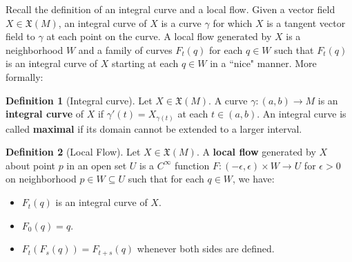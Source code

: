 \documentclass[11pt, oneside]{article}   	%
\theoremstyle{definition}
\newtheorem{definition}{Definition}[section]
\begin{document}
Recall the definition of an integral curve and a local flow. Given a vector field $X\in\mathfrak X(M)$, an integral curve of $X$ is 
a curve $\gamma$ for which $X$ is a tangent vector field to $\gamma$ at each point on the curve. A local flow generated by 
$X$ is a neighborhood $W$ and a family of curves $F_t(q)$ for each $q\in W$ such that $F_t(q)$ is an integral curve of 
$X$ starting at each $q\in W$ in a ``nice" manner. More formally:
\begin{definition}[Integral curve]
	Let $X\in\mathfrak X(M)$. A curve $\gamma : (a, b)\rightarrow M$ is an \textbf{integral curve} of $X$ if $\gamma'(t) = 
	X_{\gamma(t)}$ at each $t\in (a, b)$. An integral curve is called \textbf{maximal} if its domain cannot be extended to a 
	larger interval.
\end{definition}
\begin{definition}[Local Flow]
	Let $X\in\mathfrak X(M)$. A \textbf{local flow} generated by $X$ about point $p$ in an open set $U$ is a $C^\infty$ 
	function $F : (-\epsilon, \epsilon)\times W\rightarrow U$ for $\epsilon > 0$ on neighborhood $p\in W\subseteq U$ such 
	that for each $q\in W$, we have:
	\begin{itemize}
		\item $F_t(q)$ is an integral curve of $X$. 
		\item $F_0(q) = q$. 
		\item $F_t(F_s(q)) = F_{t + s}(q)$ whenever both sides are defined. 
	\end{itemize}
\end{definition}
\end{document}
